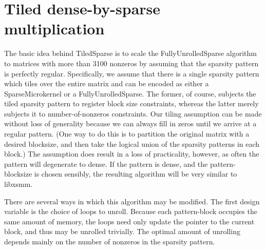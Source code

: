 \section{Tiled dense-by-sparse multiplication}

     The basic idea behind TiledSparse is to scale the FullyUnrolledSparse algorithm to 
matrices with more than 3100 nonzeros by assuming that the sparsity pattern is perfectly regular. 
Specifically, we assume that there is a single sparsity pattern which tiles over the entire matrix
and can be encoded as either a SparseMicrokernel or a FullyUnrolledSparse. The former, of course,
subjects the tiled sparsity pattern to register block size constraints, whereas the latter merely 
subjects it to number-of-nonzeros constraints. Our tiling assumption can be made without loss 
of generality because we can always fill in zeros until we arrive at a regular pattern. (One
way to do this is to partition the original matrix with a desired blocksize, and then take the 
logical union of the sparsity patterns in each block.) The assumption does result in a loss of 
practicality, however, as often the pattern will degenerate to dense. If the pattern is dense, 
and the pattern-blocksize is chosen sensibly, the resulting algorithm will be very similar to 
libxsmm.

There are several ways in which this algorithm may be modified. The first design variable is the
choice of loops to unroll. Because each pattern-block occupies the same amount of memory, the 
loops need only update the pointer to the current block, and thus may be unrolled trivially. 
The optimal amount of unrolling depends mainly on the number of nonzeros in the sparsity pattern.

